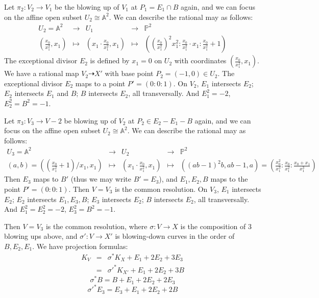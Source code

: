 \documentclass{article}
\begin{document}
Let $ \pi_2:V_2\to V_1 $ be the blowing up of  $ V_1 $ at $ P_1=E_1\cap B $ again, and we can focus on the affine open subset $ U_2\cong \mathbb{A}^2 $. We can describe the rational may as follows:
$$ \begin{array}{rccccc}
  U_2=\mathbb{A}^2&\to&U_1&\to&\mathbb{P}^2 \\
  (\frac{x_0}{x_1^2},x_1)&\mapsto&(x_1\cdot \frac{x_0}{x_1^2},x_1)&\mapsto &((\frac{x_0}{x_1^2})^2x_1^2:\frac{x_0}{x_1^2}\cdot x_1:\frac{x_0}{x_1^2}+1)
\end{array} $$
The exceptional divisor $ E_2 $ is defined by $ x_1=0 $ on $ U_2 $ with coordinates $ (\frac{x_0}{x_1^2},x_1) $. We have a rational map $ V_2\dashrightarrow X' $ with base point $ P_2=(-1,0)\in U_2 $. The exceptional divisor $ E_2 $  maps to a point $ P'=(0:0:1) $. On $ V_2 $, $ E_1 $ intersects $ E_2 $; $ E_2 $ intersects $ E_1$ and $B $;  $ B $ intersects $ E_2 $, all transversally. And $ E_1^2=-2 $, $ E_2^2= B^2=-1 $.

Let $ \pi_3:V_3\to V-2 $ be blowing up of  $ V_2 $ at $ P_2\in E_2-E_1-B $ again, and we can focus on the affine open subset $ U_2\cong \mathbb{A}^2 $. We can describe the rational may as follows:
$$ \begin{array}{rccccc}
  U_3=\mathbb{A}^2&\to&U_2&\to&\mathbb{P}^2 \\
  (a,b)=((\frac{x_0}{x_1^2}+1)/x_1,x_1)&\mapsto&(x_1\cdot \frac{x_0}{x_1^2},x_1)&\mapsto &((ab-1)^2b,ab-1,a)=(\frac{x_0^2}{x_1^3}:\frac{x_0}{x_1^2}:\frac{x_0+x_1}{x_1^3})
\end{array} $$
Then $ E_3 $ maps to $ B' $ (thus we may write $ B'=E_3 $), and $ E_1,E_2,B $ maps to the point $ P'=(0:0:1) $. Then $ V=V_3 $ is the common resolution. On $ V_3 $, $ E_1 $ intersects $ E_2 $; $ E_2 $ intersects $ E_1,E_3,B $; $ E_3 $ intersects $ E_2 $; $ B $ intersects $ E_2 $, all transversally. And $ E_1^2=E_2^2=-2 $, $ E_3^2=B^2=-1 $.

Then $ V=V_3 $ is the common resolution, where $ \sigma:V\to X $ is the composition of 3 blowing ups above, and $ \sigma':V\to X' $ is blowing-down curves in the order of $ B,E_2,E_1 $. We have projection formulas:
$$ \begin{array}{rcl}
  K_V&=&\sigma^*K_X+E_1+2E_2+3E_3\\
  &=&\sigma'^*K_{X'}+E_1+2E_2+3B
\end{array} $$
$$ \sigma^*B=B+E_1+2E_2+2E_3 $$
$$ \sigma'^*E_3=E_3+E_1+2E_2+2B $$
\end{document}
